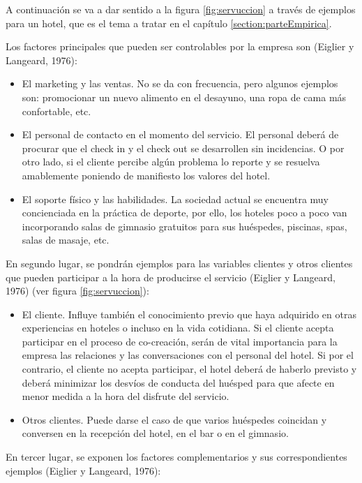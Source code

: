 A continuación se va a dar sentido a la figura \ref{fig:servuccion} a través de ejemplos para un hotel, que es el tema a tratar en el capítulo \ref{section:parteEmpirica}.

Los factores principales que pueden ser controlables por la empresa son (Eiglier y Langeard, 1976):

\begin{itemize} 
			\item El marketing y las ventas. No se da con frecuencia, pero algunos ejemplos son: promocionar un nuevo alimento en el desayuno, una ropa de cama más confortable, etc. 
			\item El personal de contacto en el momento del servicio. El personal deberá de procurar que el check in y el check out se desarrollen sin incidencias. O por otro lado, si el cliente percibe algún problema lo reporte y se resuelva amablemente poniendo de manifiesto los valores del hotel. 
			\item El soporte físico y las habilidades. La sociedad actual se encuentra muy concienciada en la práctica de deporte, por ello, los hoteles poco a poco van incorporando salas de gimnasio gratuitos para sus huéspedes, piscinas, spas, salas de masaje, etc. 

\end{itemize}

En segundo lugar, se pondrán ejemplos para las variables clientes y otros clientes que pueden participar a la hora de producirse el servicio (Eiglier y Langeard, 1976) (ver figura \ref{fig:servuccion}):

\begin{itemize} 
			\item El cliente. Influye también el conocimiento previo que haya adquirido en otras experiencias en hoteles o incluso en la vida cotidiana. Si el cliente acepta participar en el proceso de co-creación, serán de vital importancia para la empresa las relaciones y las conversaciones con el personal del hotel. Si por el contrario, el cliente no acepta participar, el hotel deberá de haberlo previsto y deberá minimizar los desvíos de conducta del huésped para que afecte en menor medida a la hora del disfrute del servicio. 
			\item Otros clientes. Puede darse el caso de que varios huéspedes coincidan y conversen en la recepción del hotel, en el bar o en el gimnasio. 

\end{itemize}

En tercer lugar, se exponen los factores complementarios y sus correspondientes ejemplos (Eiglier y Langeard, 1976):

